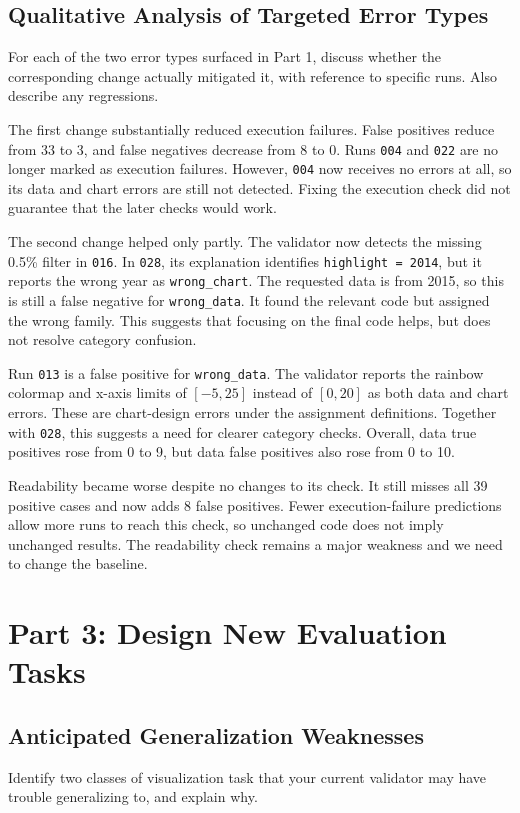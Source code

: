 \documentclass[11pt]{article}
\begin{document}
\subsection{Qualitative Analysis of Targeted Error Types}
For each of the two error types surfaced in Part 1, discuss whether the
corresponding change actually mitigated it, with reference to specific runs.
Also describe any regressions.

\medskip
The first change substantially reduced execution failures. False positives reduce
from 33 to 3, and false negatives decrease from 8 to 0. Runs \texttt{004} and
\texttt{022} are no longer marked as execution failures. However, \texttt{004}
now receives no errors at all, so its data and chart errors are still not detected.
Fixing the execution check did not guarantee that the later checks would work.

The second change helped only partly. The validator now detects the missing
0.5\% filter in \texttt{016}. In \texttt{028}, its explanation identifies
\texttt{highlight = 2014}, but it reports the wrong year as \texttt{wrong\_chart}.
The requested data is from 2015, so this is still a false negative for
\texttt{wrong\_data}. It found the relevant code but assigned the wrong family.
This suggests that focusing on the final code helps, but does not resolve
category confusion.

Run \texttt{013} is a false positive for \texttt{wrong\_data}. The validator
reports the rainbow colormap and x-axis limits of $[-5,25]$ instead of $[0,20]$
as both data and chart errors. These are chart-design errors under the assignment
definitions. Together with \texttt{028}, this suggests a need for clearer
category checks. Overall, data true positives rose from 0 to 9, but data false
positives also rose from 0 to 10.

Readability became worse despite no changes to its check. It still misses all 39
positive cases and now adds 8 false positives. Fewer execution-failure predictions
allow more runs to reach this check, so unchanged code does not imply unchanged
results. The readability check remains a major weakness and we need to change the
baseline. 

\section{Part 3: Design New Evaluation Tasks}

\subsection{Anticipated Generalization Weaknesses}
Identify two classes of visualization task that your current validator may
have trouble generalizing to, and explain why.
\end{document}
